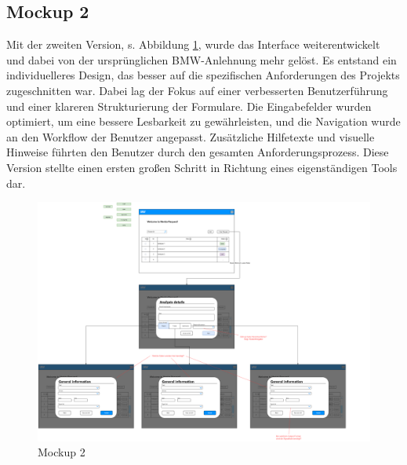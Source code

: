 \subsection*{Mockup 2}
Mit der zweiten Version, s. Abbildung \ref{fig:MockUps2.0}, wurde das Interface weiterentwickelt und dabei von der ursprünglichen BMW-Anlehnung mehr gelöst. Es entstand ein individuelleres Design, das besser auf die spezifischen Anforderungen des Projekts zugeschnitten war. Dabei lag der Fokus auf einer verbesserten Benutzerführung und einer klareren Strukturierung der Formulare. Die Eingabefelder wurden optimiert, um eine bessere Lesbarkeit zu gewährleisten, und die Navigation wurde an den Workflow der Benutzer angepasst. Zusätzliche Hilfetexte und visuelle Hinweise führten den Benutzer durch den gesamten Anforderungsprozess. Diese Version stellte einen ersten großen Schritt in Richtung eines eigenständigen Tools dar.
\begin{figure}[H]
    \centering
    \includegraphics[scale=.2]{media/MockUps2.0}
    \caption{Mockup 2}
    \label{fig:MockUps2.0}
\end{figure}
